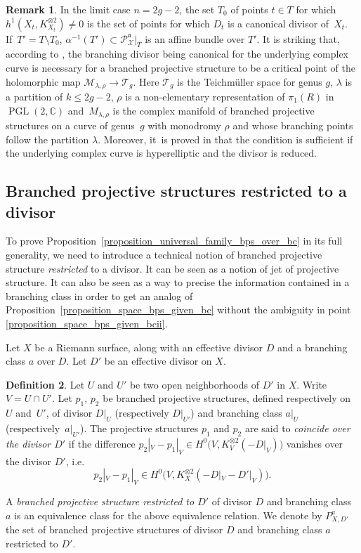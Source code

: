 \documentclass[10pt]{amsart}
\newcommand{\ie}{i.e.}
\DeclareMathOperator{\PGL}{PGL}
\theoremstyle{definition}
\newtheorem{definition}{Definition}[subsection]
\newtheorem{remark}[definition]{Remark}
\theoremstyle{plain}
\begin{document}
\begin{remark}
In the limit case $n = 2g-2$, the set $T_0$ of points $t \in T$ for which $h^1(X_t, K_{X_t}^{\otimes 2}) \neq 0$ is the set of points for which $D_t$ is a canonical divisor of~$X_t$. If~\hbox{$T' = T \setminus T_0$}, $\alpha^{-1}(T') \subset \mathcal P_{\mathcal X}^{\mathfrak a}|_{T}$ is an affine bundle over $T'$.
It is striking that, according to \cite{francaviglia-ruffoni}, the branching divisor being canonical for the underlying complex curve is necessary for a branched projective structure to be a critical point of the holomorphic map $\mathcal M_{\lambda, \rho} \to \mathcal T_g$. Here $\mathcal T_g$ is the Teichmüller space for genus $g$, $\lambda$ is a partition of $k \le 2g-2$, $\rho$ is a non-elementary representation of $\pi_1(R)$ in $\PGL(2, \mathbb C)$ and~$M_{\lambda, \rho}$ is the complex manifold of branched projective structures on a curve of genus~$g$ with monodromy $\rho$ and whose branching points follow the partition $\lambda$.
\hbox{Moreover}, it~is proved in \cite{francaviglia-ruffoni} that the condition is sufficient if the underlying complex curve is hyperelliptic and the divisor is reduced.
\end{remark}

\subsection{Branched projective structures restricted to a divisor}

To prove Proposition~\ref{proposition_universal_family_bps_over_bc} in its full generality, we need to introduce a technical notion of branched projective structure \emph{restricted} to a divisor.
It can be seen as a notion of jet of projective structure.
It can also be seen as a way to precise the information contained in a branching class in order to get an analog of Proposition~\ref{proposition_space_bps_given_bc} without the ambiguity in point \eqref{proposition_space_bps_given_bcii}.

Let $X$ be a Riemann surface, along with an effective divisor $D$ and a branching class $a$ over $D$.
Let $D'$ be an effective divisor on $X$.

\begin{definition}
Let $U$ and $U'$ be two open neighborhoods of $D'$ in $X$. Write $V = U \cap U'$.
Let $p_1$, $p_2$ be branched projective structures, defined respectively on~$U$ and~$U'$, of divisor $D|_U$ (respectively $D|_{U'}$) and branching class $a|_U$ (respectively~$a|_{U'}$). The projective structures $p_1$ and $p_2$ are said to \emph{coincide over the divisor $D'$} if the difference $p_2|_V - p_1|_V \in H^0\bigl(V, K_V^{\otimes 2}(-D|_V)\bigr)$ vanishes over the divisor $D'$, \ie
\[
p_2|_V-p_1|_V \in H^0\bigl(V, K_X^{\otimes 2}\left(-D|_V-D'|_V\right)\bigr).
\]

A \emph{branched projective structure restricted to $D'$} of divisor $D$ and branching class $a$ is an equivalence class for the above equivalence relation.
We denote by $P_{X, D'}^a$ the set of branched projective structures of divisor $D$ and branching class $a$ restricted to $D'$.
\end{definition}
\end{document}
